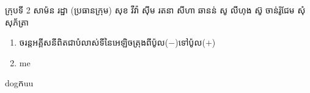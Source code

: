 \documentclass[15pt,a4paper]{article}
\author{james1}
\date{\today}
\newenvironment{kfont}{\khfont}{}
\begin{document}
\hfill\begin{minipage}{.5\linewidth}
\begin{kfont}ក្រុបទី\end{kfont} 2
\begin{kfont}សាម៉ន រដ្ឋា (ប្រធានក្រុម)\end{kfont}
\begin{kfont}សុខ វីវ៉ា\end{kfont}
\begin{kfont}សុីម រតនា\end{kfont}
សីហា ឆានន់ 
សូ លីហុង
 ស៊ូ ចាន់រ៉ូជែម
សុំ សុភ័ត្រា
\end{minipage}
\begin{enumerate}
\item 
\begin{kfont}
ចរន្តអគ្គីសនីពិតជាបំលាស់ទីនៃអេឡិចត្រុងពីប៉ូល(\(-\))ទៅប៉ូល(\(+\))
\end{kfont}
\item 
me
\end{enumerate}
dog\begin{kfont}ក\end{kfont}uu
\end{document}
